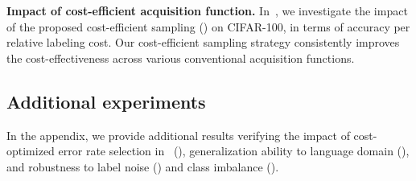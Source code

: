 \noindent\textbf{Impact of cost-efficient acquisition function.}
In~, we investigate the impact of the proposed cost-efficient sampling () on CIFAR-100, in terms of accuracy per relative labeling cost.
Our cost-efficient sampling strategy consistently improves the cost-effectiveness across various conventional acquisition functions.

\subsection{Additional experiments}
In the appendix, we provide additional results verifying the impact of cost-optimized error rate selection in~ (), generalization ability to language domain (), and robustness to label noise () and class imbalance ().
\begin{table}[t!]
    \caption{Effectiveness of the proposed cost-efficient sampling () with CSQ evaluated on CIFAR-100, measured by accuracy per cost.}
    \label{tab:ablation-cost}
    \centering
\end{table}
